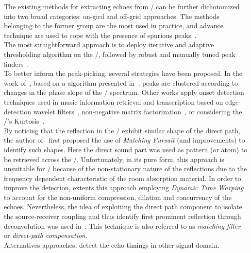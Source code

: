 \mynewline
The existing methods for extracting echoes from \RIRs/ can be further dichotomized into two broad categories: on-gird and off-grid approaches.
The methods belonging to the former group are the most used in practice, and advance technique are used to cope with the presence of spurious peaks~.
\\The most straightforward approach is to deploy iterative and adaptive thresholding algorithm on the \RIR/, followed by robust and manually tuned peak finders~.
\\To better inform the peak-picking, several strategies have been proposed.
In the work of~, based on a algorithm presented in~, peaks are clustered according to changes in the phase slope of the \RIR/ spectrum.
Other works apply onset detection techniques used in music information retrieval and transcription based on edge-detection wavelet filters~, non-negative matrix factorization~, or considering the \RIR/'s Kurtosis~.
\\By noticing that the reflection in the \RIRs/ exhibit similar shape of the direct path, the author of~ first proposed the use of \textit{Matching Pursuit} (and improvements) to identify such shapes.
Here the direct sound part was used as pattern (or atom) to be retrieved across the \RIR/.
Unfortunately, in its pure form, this approach is unsuitable for \RIRs/ because of the non-stationary nature of the reflections due to the frequency dependent characteristic of the room absorption material.
In order to improve the detection,  extents this approach employing \textit{Dynamic Time Warping} to account for the non-uniform compression, dilation and concurrency of the echoes.
Nevertheless, the idea of exploiting the direct path component to isolate the source-receiver coupling and thus identify first prominent reflection through deconvolution was used in~.
This technique is also referred to as \textit{matching filter} or \textit{direct-path compensation}.
\\Alternatives approaches, detect the echo timings in other signal domain.
